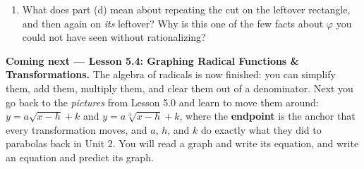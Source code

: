 \documentclass[10pt]{article}
\begin{document}
\begin{extensionbox}
\begin{enumerate}[label=(\alph*), leftmargin=1.8em, itemsep=5pt]
        proportions as the original. 
  \item What does part (d) mean about repeating the cut on the leftover rectangle, and then again
        on \emph{its} leftover? Why is this one of the few facts about $\varphi$ you could not have
        seen without rationalizing? 
\end{enumerate}
\end{extensionbox}

\begin{spiralbox}
\textbf{Coming next --- Lesson 5.4: Graphing Radical Functions \& Transformations.} The algebra of
radicals is now finished: you can simplify them, add them, multiply them, and clear them out of a
denominator. Next you go back to the \emph{pictures} from Lesson 5.0 and learn to move them around:
$y=a\sqrt{x-h}+k$ and $y=a\sqrt[3]{x-h}+k$, where the \textbf{endpoint} is the anchor that every
transformation moves, and $a$, $h$, and $k$ do exactly what they did to parabolas back in Unit 2.
You will read a graph and write its equation, and write an equation and predict its graph.
\end{spiralbox}
\end{document}
